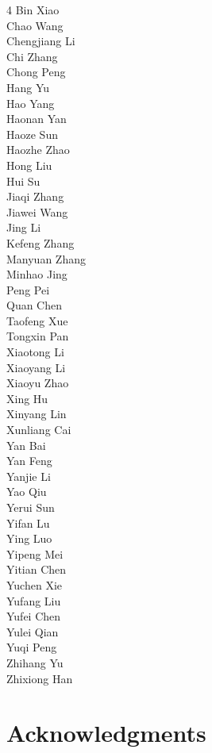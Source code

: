 \documentclass{article}
\begin{document}
\begin{multicols}{4}
\small
Bin Xiao\\
Chao Wang\\
Chengjiang Li\\
Chi Zhang\\
Chong Peng\\
Hang Yu\\
Hao Yang\\
Haonan Yan\\
Haoze Sun\\
Haozhe Zhao\\
Hong Liu\\
Hui Su\\
Jiaqi Zhang\\
Jiawei Wang\\
Jing Li\\
Kefeng Zhang\\
Manyuan Zhang\\
Minhao Jing\\
Peng Pei\\
Quan Chen\\
Taofeng Xue\\
Tongxin Pan\\
Xiaotong Li\\
Xiaoyang Li\\
Xiaoyu Zhao\\
Xing Hu\\
Xinyang Lin\\
Xunliang Cai\\
Yan Bai\\
Yan Feng\\
Yanjie Li\\
Yao Qiu\\
Yerui Sun\\
Yifan Lu\\
Ying Luo\\
Yipeng Mei\\
Yitian Chen\\
Yuchen Xie\\
Yufang Liu\\
Yufei Chen\\
Yulei Qian\\
Yuqi Peng\\
Zhihang Yu\\
Zhixiong Han
\end{multicols}

\vspace{0.3em}
\section*{Acknowledgments}
\end{document}
